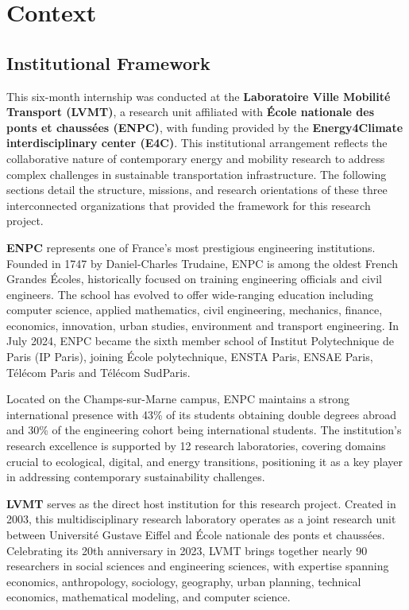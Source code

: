 \chapter{Context}\label{chap2}

\section{Institutional Framework}
This six-month internship was conducted at the \textbf{Laboratoire Ville Mobilité Transport (LVMT)}, a research unit affiliated with \textbf{École nationale des ponts et chaussées (ENPC)}, with funding provided by the \textbf{Energy4Climate interdisciplinary center (E4C)}. This institutional arrangement reflects the collaborative nature of contemporary energy and mobility research to address complex challenges in sustainable transportation infrastructure. The following sections detail the structure, missions, and research orientations of these three interconnected organizations that provided the framework for this research project.

\textbf{ENPC} represents one of France's most prestigious engineering institutions. Founded in 1747 by Daniel-Charles Trudaine, ENPC is among the oldest French Grandes Écoles, historically focused on training engineering officials and civil engineers. The school has evolved to offer wide-ranging education including computer science, applied mathematics, civil engineering, mechanics, finance, economics, innovation, urban studies, environment and transport engineering. In July 2024, ENPC became the sixth member school of Institut Polytechnique de Paris (IP Paris), joining École polytechnique, ENSTA Paris, ENSAE Paris, Télécom Paris and Télécom SudParis.

Located on the Champs-sur-Marne campus, ENPC maintains a strong international presence with 43\% of its students obtaining double degrees abroad and 30\% of the engineering cohort being international students. The institution's research excellence is supported by 12 research laboratories, covering domains crucial to ecological, digital, and energy transitions, positioning it as a key player in addressing contemporary sustainability challenges.

\textbf{LVMT} serves as the direct host institution for this research project. Created in 2003, this multidisciplinary research laboratory operates as a joint research unit between Université Gustave Eiffel and École nationale des ponts et chaussées. Celebrating its 20th anniversary in 2023, LVMT brings together nearly 90 researchers in social sciences and engineering sciences, with expertise spanning economics, anthropology, sociology, geography, urban planning, technical economics, mathematical modeling, and computer science.

